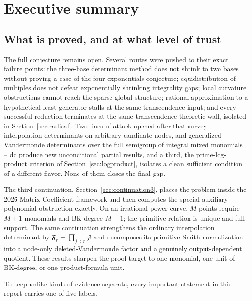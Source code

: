 \documentclass[11pt,oneside]{article}
\theoremstyle{definition}
\theoremstyle{remark}
\newcommand{\SF}[1]{\mathfrak F_{#1}}
\begin{document}
\tableofcontents
\clearpage
{}
\section{Executive summary}
\label{sec:executive}

\subsection{What is proved, and at what level of trust}
\label{ex:trust}

The full conjecture remains open.  Several routes were pushed to their exact failure points:
the three-base determinant method does not shrink to two bases without proving a case of the
four exponentials conjecture; equidistribution of multiples does not defeat exponentially
shrinking integrality gaps; local curvature obstructions cannot reach the sparse global
structure; rational approximation to a hypothetical least generator stalls at the same
transcendence input; and every successful reduction terminates at the same
transcendence-theoretic wall, isolated in Section~\ref{sec:radical}.  Two lines of attack
opened after that survey -- interpolation determinants on arbitrary candidate nodes, and
generalized Vandermonde determinants over the full semigroup of integral mixed monomials --
do produce new unconditional partial results, and a third, the prime-log-product criterion of
Section~\ref{sec:logproduct}, isolates a clean sufficient condition of a different flavor.
None of them closes the final gap.

The third continuation, Section~\ref{sec:continuation3}, places the problem inside the 2026
Matrix Coefficient framework and then computes the special auxiliary-polynomial obstruction
exactly.  On an irrational power curve, $M$ points require $M+1$ monomials and BK-degree
$M-1$; the primitive relation is unique and full-support.  The same continuation strengthens
the ordinary interpolation determinant by $\SF r=\prod_{j<r}j!$ and decomposes its primitive
Smith normalization into a node-only deleted-Vandermonde factor and a genuinely
output-dependent quotient.  These results sharpen the proof target to one monomial, one unit
of BK-degree, or one product-formula unit.

To keep unlike kinds of evidence separate, every important statement in this report carries
one of five labels.
\end{document}
